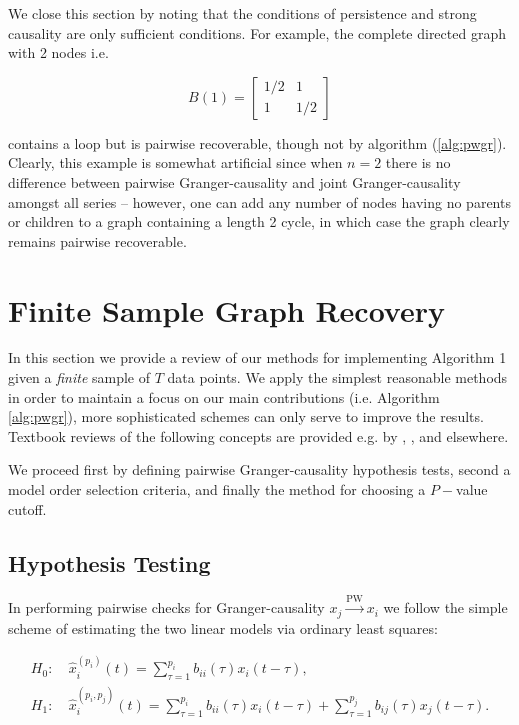 \documentclass[12pt]{article}
\def\pwgc{\overset{\text{PW}}{\rightarrow}}  %
\begin{document}
\begin{example}
  We close this section by noting that the conditions of persistence
  and strong causality are only sufficient conditions.  For example,
  the complete directed graph with 2 nodes i.e.

  \begin{equation*}
    B(1) = \left[ \begin{array}{cc} 1/2 & 1 \\ 1 & 1/2 \end{array}\right]
  \end{equation*}

  contains a loop but is pairwise recoverable, though not by algorithm
  (\ref{alg:pwgr}).  Clearly, this example is somewhat artificial
  since when $n = 2$ there is no difference between pairwise
  Granger-causality and joint Granger-causality amongst all series --
  however, one can add any number of nodes having no parents or
  children to a graph containing a length 2 cycle, in which case the
  graph clearly remains pairwise recoverable.
\end{example}

\section{Finite Sample Graph Recovery}
\label{sec:structure_learning}
In this section we provide a review of our methods for implementing
Algorithm 1 given a \textit{finite} sample of $T$ data points.  We
apply the simplest reasonable methods in order to maintain a focus on
our main contributions (i.e. Algorithm \ref{alg:pwgr}), more
sophisticated schemes can only serve to improve the results.  Textbook
reviews of the following concepts are provided e.g. by
\cite{all_of_statistics}, \cite{murphy_mlp}, and elsewhere.

We proceed first by defining pairwise Granger-causality hypothesis
tests, second a model order selection criteria, and finally the method
for choosing a $P-$value cutoff.

\subsection{Hypothesis Testing}
In performing pairwise checks for Granger-causality $x_j \pwgc x_i$ we
follow the simple scheme of estimating the two linear models via
ordinary least squares:

\begin{align}
  H_0:&\ \widehat{x}_i^{(p_i)}(t) = \sum_{\tau = 1}^{p_i} b_{ii}(\tau)x_i(t - \tau),\\
  H_1:&\ \widehat{x}_i^{(p_i, p_j)}(t) = \sum_{\tau = 1}^{p_i} b_{ii}(\tau)x_i(t - \tau) + \sum_{\tau = 1}^{p_j}b_{ij}(\tau)x_j(t - \tau).
\end{align}
\end{document}
